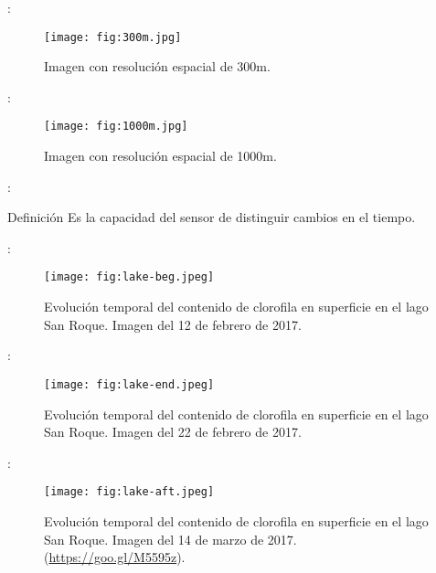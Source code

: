 \begin{frame}{\secname : \subsecname}
    \begin{figure}[h!]
        \centering
        \texttt{[image: fig:300m.jpg]}
        \caption{Imagen con resolución espacial de 300m.}
    \end{figure}
\end{frame}

\begin{frame}{\secname : \subsecname}
    \begin{figure}[h!]
        \centering
        \texttt{[image: fig:1000m.jpg]}
        \caption{Imagen con resolución espacial de 1000m.}
    \end{figure}
\end{frame}


\begin{frame}{\secname : \subsecname}
    \begin{block}{Definición}
        Es la capacidad del sensor de distinguir cambios en el tiempo.
    \end{block}
\end{frame}

\begin{frame}{\secname : \subsecname}
    \begin{figure}[h!]
        \centering
        \texttt{[image: fig:lake-beg.jpeg]}
        \caption{Evolución temporal del contenido de clorofila en superficie en el lago San Roque. Imagen del 12 de febrero de 2017.}
        \label{fig:lake-beg}
    \end{figure}
\end{frame}

\begin{frame}{\secname : \subsecname}
    \begin{figure}[h!]
        \centering
        \texttt{[image: fig:lake-end.jpeg]}
        \caption{Evolución temporal del contenido de clorofila en superficie en el lago San Roque. Imagen del 22 de febrero de 2017.}
        \label{fig:lake-end}
    \end{figure}
\end{frame}

\begin{frame}{\secname : \subsecname}
    \begin{figure}[h!]
        \centering
        \texttt{[image: fig:lake-aft.jpeg]}
        \caption{Evolución temporal del contenido de clorofila en superficie en el lago San Roque. Imagen del 14 de marzo de 2017. (\href{https://goo.gl/M5595z}{https://goo.gl/M5595z}).}
        \label{fig:lake-aft}
    \end{figure}
\end{frame}

